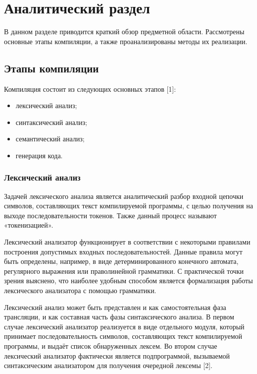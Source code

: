 \chapter{Аналитический раздел}

В данном разделе приводится краткий обзор предметной области.
Рассмотрены основные этапы компиляции, а также проанализированы методы их реализации.

\section{Этапы компиляции}

Компиляция состоит из следующих основных этапов [1]:
\begin{itemize}
	\item лексический анализ;
	\item синтаксический анализ;
	\item семантический анализ;
	\item генерация кода.
\end{itemize}

\subsection{Лексический анализ}

Задачей лексического анализа является аналитический разбор входной цепочки символов, составляющих текст компилируемой программы, с целью получения на выходе последовательности токенов.
Также данный процесс называют «токенизацией».

Лексический анализатор функционирует в соответствии с некоторыми правилами построения допустимых входных последовательностей.
Данные правила могут быть определены, например, в виде детерминированного конечного автомата, регулярного выражения или праволинейной грамматики.
С практической точки зрения выяснено, что наиболее удобным способом является формализация работы лексического анализатора с помощью грамматики.

Лексический анализ может быть представлен и как самостоятельная фаза трансляции, и как составная часть фазы синтаксического анализа.
В первом случае лексический анализатор реализуется в виде отдельного модуля, который принимает последовательность символов, составляющих текст компилируемой программы, и выдаёт список обнаруженных лексем.
Во втором случае лексический анализатор фактически является подпрограммой, вызываемой синтаксическим анализатором для получения очередной лексемы [2].

